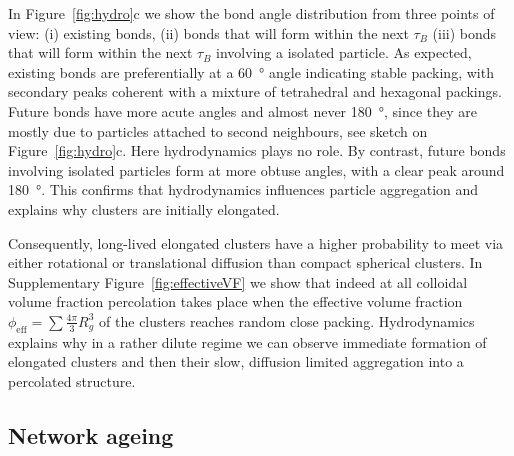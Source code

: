 In Figure~\ref{fig:hydro}c we show the bond angle distribution from three points of view: (i) existing bonds, (ii) bonds that will form within the next $\tau_B$ (iii) bonds that will form within the next $\tau_B$ involving a isolated particle. As expected, existing bonds are preferentially at a \SI{60}{\degree} angle indicating stable packing, with secondary peaks coherent with a mixture of tetrahedral and hexagonal packings. Future bonds have more acute angles and almost never \SI{180}{\degree}, since they are mostly due to particles attached to second neighbours, see sketch on Figure~\ref{fig:hydro}c. Here hydrodynamics plays no role. By contrast, future bonds involving isolated particles form at more obtuse angles, with a clear peak around \SI{180}{\degree}. This confirms that hydrodynamics influences particle aggregation and explains why clusters are initially elongated.

Consequently, long-lived elongated clusters have a higher probability to meet via either rotational or translational diffusion than compact spherical clusters. In Supplementary Figure~\ref{fig:effectiveVF} we show that indeed at all colloidal volume fraction percolation takes place when the effective volume fraction $\phi_\text{eff} = \sum\frac{4\pi}{3}R_g^3$ of the clusters reaches random close packing. Hydrodynamics explains why in a rather dilute regime we can observe immediate formation of elongated clusters and then their slow, diffusion limited aggregation into a percolated structure.

\subsection*{Network ageing}


